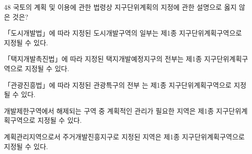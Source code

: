 \begin{question}{48}
국토의 계획 및 이용에 관한 법령상 지구단위계획의 지정에 관한 설명으로 옳지 않은 것은?
\begin{choices}
  \item 「도시개발법」에 따라 지정된 도시개발구역의 일부는 제1종 지구단위계획구역으로 지정될 수 있다.
  \item 「택지개발촉진법」에 따라 지정된 택지개발예정지구의 전부는 제1종 지구단위계획구역으로 지정될 수 있다.
  \item 「관광진흥법」에 따라 지정된 관광특구의 전부 는 제1종 지구단위계획구역으로 지정될 수 있다.
  \item 개발제한구역에서 해제되는 구역 중 계획적인 관리가 필요한 지역은 제1종 지구단위계획구역으로 지정될 수 있다.
  \item 계획관리지역으로서 주거개발진흥지구로 지정된 지역은 제1종 지구단위계획구역으로 지정될 수 있다.
\end{choices}
\end{question}
